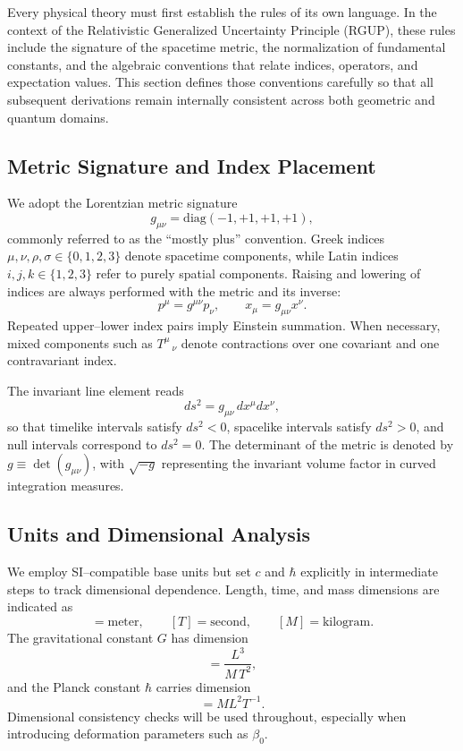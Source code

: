 \documentclass[11pt,oneside]{book}
\numberwithin{equation}{chapter}
\begin{document}
Every physical theory must first establish the rules of its own language.  
In the context of the Relativistic Generalized Uncertainty Principle (RGUP), these rules include the signature of the spacetime metric, the normalization of fundamental constants, and the algebraic conventions that relate indices, operators, and expectation values.  
This section defines those conventions carefully so that all subsequent derivations remain internally consistent across both geometric and quantum domains.

\subsection*{Metric Signature and Index Placement}

We adopt the Lorentzian metric signature
\begin{equation}
g_{\mu\nu} = \mathrm{diag}(-1, +1, +1, +1),
\end{equation}
commonly referred to as the ``mostly plus'' convention.  
Greek indices $\mu,\nu,\rho,\sigma \in \{0,1,2,3\}$ denote spacetime components, while Latin indices $i,j,k \in \{1,2,3\}$ refer to purely spatial components.  
Raising and lowering of indices are always performed with the metric and its inverse:
\begin{equation}
p^\mu = g^{\mu\nu} p_\nu, \qquad
x_\mu = g_{\mu\nu} x^\nu.
\end{equation}
Repeated upper–lower index pairs imply Einstein summation.  
When necessary, mixed components such as ${T^\mu}_{\ \nu}$ denote contractions over one covariant and one contravariant index.

The invariant line element reads
\begin{equation}
ds^2 = g_{\mu\nu}\,dx^\mu dx^\nu,
\end{equation}
so that timelike intervals satisfy $ds^2 < 0$, spacelike intervals satisfy $ds^2 > 0$, and null intervals correspond to $ds^2 = 0$.  
The determinant of the metric is denoted by $g \equiv \det(g_{\mu\nu})$, with $\sqrt{-g}$ representing the invariant volume factor in curved integration measures.

\subsection*{Units and Dimensional Analysis}

We employ SI–compatible base units but set $c$ and $\hbar$ explicitly in intermediate steps to track dimensional dependence.  
Length, time, and mass dimensions are indicated as
\begin{equation}
[L] = \text{meter}, \qquad
[T] = \text{second}, \qquad
[M] = \text{kilogram}.
\end{equation}
The gravitational constant $G$ has dimension
\begin{equation}
[G] = \frac{L^3}{M\,T^2},
\end{equation}
and the Planck constant $\hbar$ carries dimension
\begin{equation}
[\hbar] = M L^2 T^{-1}.
\end{equation}
Dimensional consistency checks will be used throughout, especially when introducing deformation parameters such as $\beta_0$.
\end{document}
